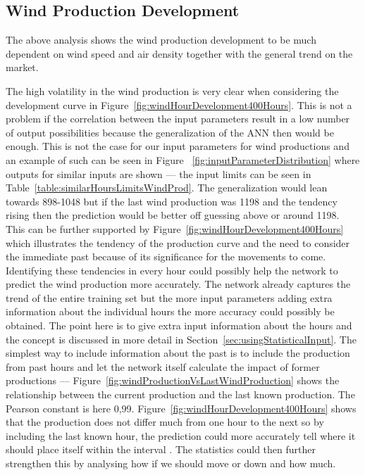 \subsection{Wind Production Development}
\label{sec:windProductionDev}
The above analysis shows the wind production development to be much dependent on wind speed and air density together with the general trend on the market. 

The high volatility in the wind production is very clear when considering the development curve in Figure~\ref{fig:windHourDevelopment400Hours}. This is not a problem if the correlation between the input parameters result in a low number of output possibilities because the generalization of the ANN then would be enough. This is not the case for our input parameters for wind productions and an example of such can be seen in Figure ~\ref{fig:inputParameterDistribution} where outputs for similar inputs are shown --- the input limits can be seen in Table~\ref{table:similarHoursLimitsWindProd}. The generalization would lean towards 898-1048 but if the last wind production was 1198 and the tendency rising then the prediction would be better off guessing above or around 1198. This can be further supported by Figure~\ref{fig:windHourDevelopment400Hours} which illustrates the tendency of the production curve and the need to consider the immediate past because of its significance for the movements to come. Identifying these tendencies in every hour could possibly help the network to predict the wind production more accurately. The network already captures the trend of the entire training set but the more input parameters adding extra information about the individual hours the more accuracy could possibly be obtained. The point here is to give extra input information about the hours and the concept is discussed in more detail in Section~\ref{sec:usingStatisticalInput}. The simplest way to include information about the past is to include the production from past hours and let the network itself calculate the impact of former productions --- Figure~\ref{fig:windProductionVsLastWindProduction} shows the relationship between the current production and the last known production. The Pearson constant is here 0,99. Figure~\ref{fig:windHourDevelopment400Hours} shows that the production does not differ much from one hour to the next so by including the last known hour, the prediction could more accurately tell where it should place itself within the interval . The statistics could then further strengthen this by analysing how if we should move or down and how much.

